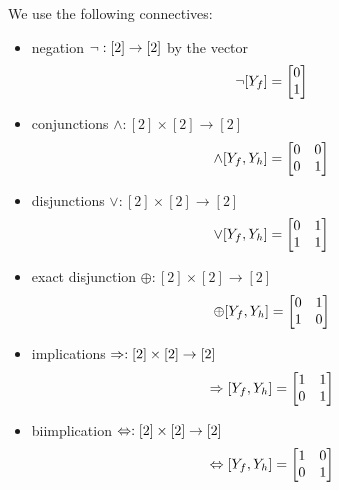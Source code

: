 \begin{example}\label{exa:connectives}
	We use the following connectives:
	\begin{itemize}
	\item negation $\lnot: [2]\rightarrow [2]$ by the vector
	\begin{align*}
		\lnot[Y_{f}] = \begin{bmatrix}
		0  \\
		1  
		\end{bmatrix} 
	\end{align*}
	\item conjunctions $\land:  [2]\times[2] \rightarrow[2]$
		\begin{align*}
			\land[Y_{f},Y_{h}]
			 = \begin{bmatrix}
			0 & 0 \\
			0 & 1 
			\end{bmatrix}
		\end{align*}
	\item disjunctions $\lor : [2]\times[2] \rightarrow[2]$
		\begin{align*}
			\lor[Y_{f},Y_{h}]
			 = \begin{bmatrix}
			0 & 1 \\
			1 & 1 
			\end{bmatrix}
		\end{align*}
	\item exact disjunction $\oplus:  [2]\times[2] \rightarrow[2]$	
		\begin{align*}
			\oplus[Y_{f},Y_{h}]
			 = \begin{bmatrix}
			0 & 1 \\
			1 & 0 
			\end{bmatrix}
		\end{align*}
	\item implications $\Rightarrow:  [2]\times[2] \rightarrow[2]$ 
		\begin{align*}
			\Rightarrow[Y_{f},Y_{h}]
			 = \begin{bmatrix}
			1 & 1 \\
			0 & 1 
			\end{bmatrix}
		\end{align*}
	\item biimplication $\Leftrightarrow:  [2]\times[2] \rightarrow[2]$ 
		\begin{align*}
			\Leftrightarrow[Y_{f},Y_{h}]
			 = \begin{bmatrix}
			1 & 0 \\
			0 & 1 
			\end{bmatrix}
		\end{align*}
	\end{itemize}
\end{example}

